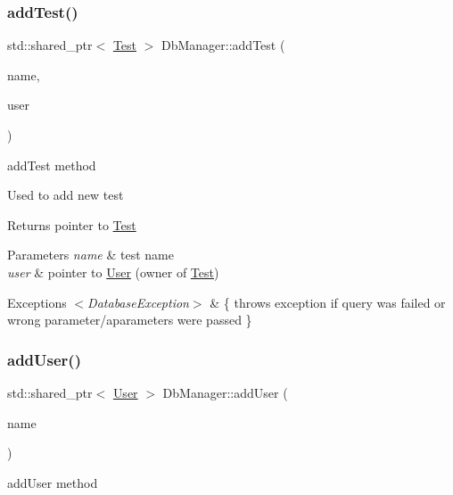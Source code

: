 \subsubsection{\texorpdfstring{add\+Test()}{addTest()}}
{\footnotesize\ttfamily std\+::shared\+\_\+ptr$<$ \hyperlink{class_test}{Test} $>$ Db\+Manager\+::add\+Test (\begin{DoxyParamCaption}\item[{const Q\+String \&}]{name,  }\item[{const std\+::shared\+\_\+ptr$<$ \hyperlink{class_user}{User} $>$}]{user }\end{DoxyParamCaption})}



add\+Test method 

Used to add new test \begin{DoxyReturn}{Returns}
pointer to \hyperlink{class_test}{Test} 
\end{DoxyReturn}

\begin{DoxyParams}{Parameters}
{\em name} & test name \\
\hline
{\em user} & pointer to \hyperlink{class_user}{User} (owner of \hyperlink{class_test}{Test}) \\
\hline
\end{DoxyParams}

\begin{DoxyExceptions}{Exceptions}
{\em $<$\+Database\+Exception$>$} & \{ throws exception if query was failed or wrong parameter/aparameters were passed \} \\
\hline
\end{DoxyExceptions}
\mbox{\label{class_db_manager_afab938045b88229acbe9463f45289961}} 
\subsubsection{\texorpdfstring{add\+User()}{addUser()}}
{\footnotesize\ttfamily std\+::shared\+\_\+ptr$<$ \hyperlink{class_user}{User} $>$ Db\+Manager\+::add\+User (\begin{DoxyParamCaption}\item[{const Q\+String \&}]{name }\end{DoxyParamCaption})}



add\+User method 

